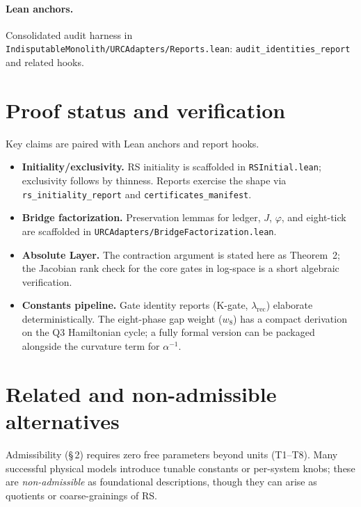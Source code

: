 \documentclass[11pt]{article}
\begin{document}
\paragraph{Lean anchors.} Consolidated audit harness in \texttt{IndisputableMonolith/URCAdapters/Reports.lean}: \texttt{audit\_identities\_report} and related hooks.

\section{Proof status and verification}\label{sec:status}
Key claims are paired with Lean anchors and report hooks.
\begin{itemize}
  \item \textbf{Initiality/exclusivity.} RS initiality is scaffolded in \texttt{RSInitial.lean}; exclusivity follows by thinness. Reports exercise the shape via \texttt{rs\_initiality\_report} and \texttt{certificates\_manifest}.
  \item \textbf{Bridge factorization.} Preservation lemmas for ledger, \(J\), \(\varphi\), and eight\mbox{-}tick are scaffolded in \texttt{URCAdapters/BridgeFactorization.lean}.
  \item \textbf{Absolute Layer.} The contraction argument is stated here as Theorem~2; the Jacobian rank check for the core gates in log\mbox{-}space is a short algebraic verification.
  \item \textbf{Constants pipeline.} Gate identity reports (K\mbox{-}gate, \(\lambda_{\mathrm{rec}}\)) elaborate deterministically. The eight\mbox{-}phase gap weight (\(w_8\)) has a compact derivation on the Q3 Hamiltonian cycle; a fully formal version can be packaged alongside the curvature term for \(\alpha^{-1}\).
\end{itemize}

\section{Related and non\mbox{-}admissible alternatives}
Admissibility (\S\,2) requires zero free parameters beyond units (T1--T8). Many successful physical models introduce tunable constants or per\mbox{-}system knobs; these are \emph{non\mbox{-}admissible} as foundational descriptions, though they can arise as quotients or coarse\mbox{-}grainings of RS.
\end{document}

